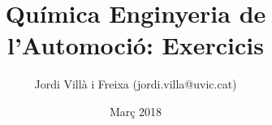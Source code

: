 


\title{Química Enginyeria de l'Automoció: Exercicis}
\date{Març 2018}
\author{Jordi Vill\`a i Freixa (jordi.villa@uvic.cat)}






